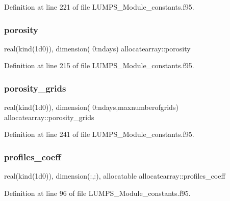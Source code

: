 Definition at line 221 of file L\+U\+M\+P\+S\+\_\+\+Module\+\_\+constants.\+f95.

\mbox{\label{namespaceallocatearray_ad6779574483b9977e34962301653f997}} 
\subsubsection{\texorpdfstring{porosity}{porosity}}
{\footnotesize\ttfamily real(kind(1d0)), dimension( 0\+:ndays) allocatearray\+::porosity}



Definition at line 215 of file L\+U\+M\+P\+S\+\_\+\+Module\+\_\+constants.\+f95.

\mbox{\label{namespaceallocatearray_a904d246737e2626f58f7392e4c610372}} 
\subsubsection{\texorpdfstring{porosity\+\_\+grids}{porosity\_grids}}
{\footnotesize\ttfamily real(kind(1d0)), dimension( 0\+:ndays,maxnumberofgrids) allocatearray\+::porosity\+\_\+grids}



Definition at line 241 of file L\+U\+M\+P\+S\+\_\+\+Module\+\_\+constants.\+f95.

\mbox{\label{namespaceallocatearray_afdc7bc9e6e97bc7071ef1fc93ea78856}} 
\subsubsection{\texorpdfstring{profiles\+\_\+coeff}{profiles\_coeff}}
{\footnotesize\ttfamily real(kind(1d0)), dimension(\+:,\+:), allocatable allocatearray\+::profiles\+\_\+coeff}



Definition at line 96 of file L\+U\+M\+P\+S\+\_\+\+Module\+\_\+constants.\+f95.

\mbox{\label{namespaceallocatearray_a8a4eb23995f7afa0230b8afc6fefd81d}} 
